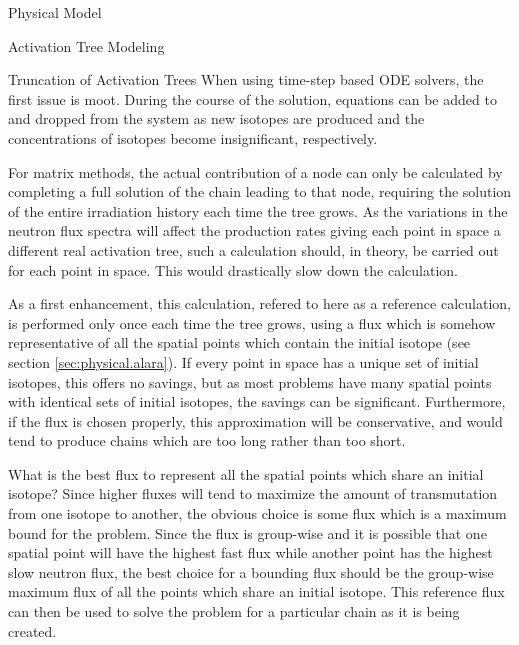 \begin{chapter}{Physical Model\label{chap:physical}}
\begin{section}{Activation Tree Modeling\label{sec:physical.chains}}
\begin{subsection}{Truncation of Activation Trees\label{sec:physical.chains.trunc}}
    When using time-step based ODE solvers, the first issue is moot.
    During the course of the solution, equations can be added to and
    dropped from the system as new isotopes are produced and the
    concentrations of isotopes become insignificant,
    respectively\cite{FISPACT}.
    
    For matrix methods, the actual contribution of a node can only be
    calculated by completing a full solution of the chain leading to
    that node, requiring the solution of the entire irradiation
    history each time the tree grows.  As the variations in the
    neutron flux spectra will affect the production rates giving each
    point in space a different real activation tree, such a
    calculation should, in theory, be carried out for each point in
    space.  This would drastically slow down the calculation.
    
    As a first enhancement, this calculation, refered to here as a
    reference calculation, is performed only once each time the tree
    grows, using a flux which is somehow representative of all the
    spatial points which contain the initial isotope (see section
    \ref{sec:physical.alara}). If every point in space has a unique
    set of initial isotopes, this offers no savings, but as most
    problems have many spatial points with identical sets of initial
    isotopes, the savings can be significant.  Furthermore, if the
    flux is chosen properly, this approximation will be conservative,
    and would tend to produce chains which are too long rather than
    too short.
    
    What is the best flux to represent all the spatial points which
    share an initial isotope?  Since higher fluxes will tend to
    maximize the amount of transmutation from one isotope to another,
    the obvious choice is some flux which is a maximum bound for the
    problem.  Since the flux is group-wise and it is possible that one
    spatial point will have the highest fast flux while another point
    has the highest slow neutron flux, the best choice for a bounding
    flux should be the group-wise maximum flux of all the points which
    share an initial isotope.  This reference flux can then be used to
    solve the problem for a particular chain as it is being created.
    

\end{subsection}
\end{section}
\end{chapter}
